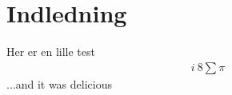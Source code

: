 \chapter{Indledning}
Her er en lille test 
\begin{align}
i \  8 \sum \pi
\end{align}
...and it was delicious \cite{Tracker}